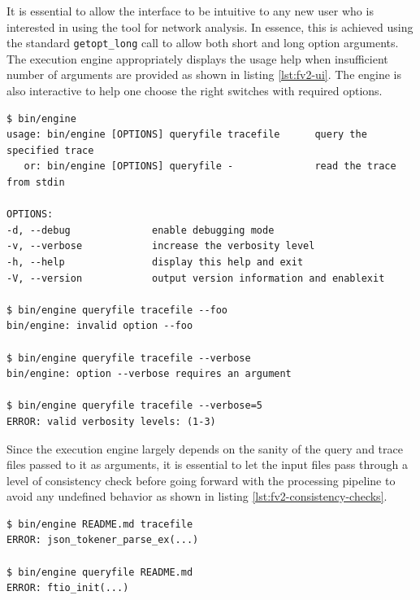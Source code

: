 It is essential to allow the interface to be intuitive to any new user who is
interested in using the tool for network analysis. In essence, this is
achieved  using the
standard \texttt{getopt\_long} call to allow both short and long option
arguments. The execution engine appropriately displays the usage help when
insufficient number of arguments are provided as shown in listing
\ref{lst:fv2-ui}.  The engine is also interactive to help one choose the right
switches with required options.

\begin{lstlisting}
$ bin/engine
usage: bin/engine [OPTIONS] queryfile tracefile      query the specified trace
   or: bin/engine [OPTIONS] queryfile -              read the trace from stdin

OPTIONS:
-d, --debug              enable debugging mode
-v, --verbose            increase the verbosity level
-h, --help               display this help and exit
-V, --version            output version information and enablexit

$ bin/engine queryfile tracefile --foo
bin/engine: invalid option --foo

$ bin/engine queryfile tracefile --verbose
bin/engine: option --verbose requires an argument

$ bin/engine queryfile tracefile --verbose=5
ERROR: valid verbosity levels: (1-3)
\end{lstlisting}

Since the execution engine largely depends on the sanity of the query and
trace files passed to it as arguments, it is essential to let the input files
pass  through a level of consistency check
before going forward with the processing pipeline to avoid any undefined
behavior as shown in listing \ref{lst:fv2-consistency-checks}.

\begin{lstlisting}
$ bin/engine README.md tracefile
ERROR: json_tokener_parse_ex(...)

$ bin/engine queryfile README.md
ERROR: ftio_init(...)
\end{lstlisting}

